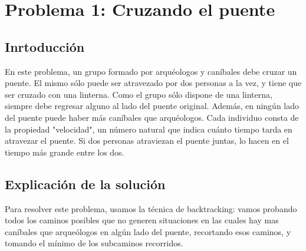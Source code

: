 \documentclass[spanish,12pt]{article}
\begin{document}
\author{Grupo  \\Alvarez Vico Jazm\'in\\Cortés Conde Titó Javier María\\Pedraza Marcelo \\ Rozenberg Uriel Jonathan}


\maketitle


\clearpage

\tableofcontents
\cleardoublepage

\section{Problema 1: Cruzando el puente}

\subsection{Inrtoducción}

En este problema, un grupo formado por arquéologos y caníbales debe cruzar un puente. El mismo sólo puede ser atravezado por dos personas a la vez, y tiene que ser cruzado con una linterna. Como el grupo sólo dispone de una linterna, siempre debe regresar alguno al lado del puente original. Además, en ningún lado del puente puede haber más caníbales que arquéologos.
Cada individuo consta de la propiedad "velocidad", un número natural que indica cuánto tiempo tarda en atravezar el puente. Si dos personas atraviezan el puente juntas, lo hacen en el tiempo más grande entre los dos.
 

\subsection{Explicación de la solución}
Para resolver este problema, usamos la técnica de backtracking: vamos probando todos los caminos posibles que no generen situaciones en las cuales hay mas caníbales que arqueólogos en algún lado del puente, recortando esos caminos, y tomando  el mínimo de los subcaminos recorridos.
\end{document}
